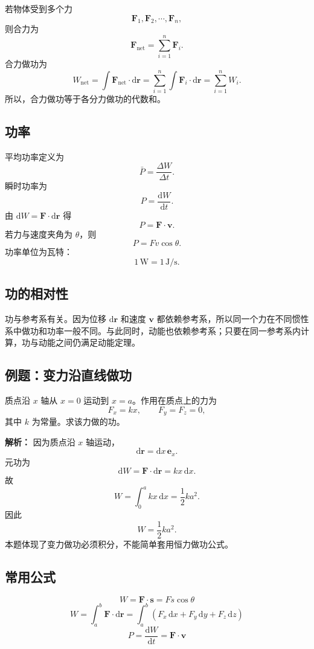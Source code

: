 若物体受到多个力
\[
    \boldsymbol F_1,\boldsymbol F_2,\cdots,\boldsymbol F_n,
\]
则合力为
\[
    \boldsymbol F_{\mathrm{net}}=\sum_{i=1}^{n}\boldsymbol F_i .
\]
合力做功为
\[
    W_{\mathrm{net}}
    =
    \int \boldsymbol F_{\mathrm{net}}\cdot\mathrm d\boldsymbol r
    =
    \sum_{i=1}^{n}
    \int \boldsymbol F_i\cdot\mathrm d\boldsymbol r
    =
    \sum_{i=1}^{n}W_i .
\]
所以，合力做功等于各分力做功的代数和。

\subsection{功率}

平均功率定义为
\[
    \bar P=\frac{\Delta W}{\Delta t}.
\]
瞬时功率为
\[
    P=\frac{\mathrm dW}{\mathrm dt}.
\]
由 $\mathrm dW=\boldsymbol F\cdot\mathrm d\boldsymbol r$ 得
\[
    \boxed{
    P=\boldsymbol F\cdot\boldsymbol v
    } .
\]
若力与速度夹角为 $\theta$，则
\[
    P=Fv\cos\theta .
\]
功率单位为瓦特：
\[
    1\,\mathrm W=1\,\mathrm{J/s}.
\]

\subsection{功的相对性}

功与参考系有关。因为位移 $\mathrm d\boldsymbol r$ 和速度 $\boldsymbol v$ 都依赖参考系，所以同一个力在不同惯性系中做功和功率一般不同。与此同时，动能也依赖参考系；只要在同一参考系内计算，功与动能之间仍满足动能定理。

\subsection{例题：变力沿直线做功}

质点沿 $x$ 轴从 $x=0$ 运动到 $x=a$。作用在质点上的力为
\[
    F_x=kx,\qquad F_y=F_z=0,
\]
其中 $k$ 为常量。求该力做的功。

\textbf{解析：} 因为质点沿 $x$ 轴运动，
\[
    \mathrm d\boldsymbol r=\mathrm dx\,\boldsymbol e_x.
\]
元功为
\[
    \mathrm dW=\boldsymbol F\cdot\mathrm d\boldsymbol r=kx\,\mathrm dx.
\]
故
\[
    W=\int_0^a kx\,\mathrm dx=\frac{1}{2}ka^2.
\]
因此
\[
    \boxed{W=\frac{1}{2}ka^2}.
\]
本题体现了变力做功必须积分，不能简单套用恒力做功公式。

\subsection{常用公式}

\[
    W=\boldsymbol F\cdot\boldsymbol s=Fs\cos\theta
\]
\[
    \boxed{
    W=\int_a^b\boldsymbol F\cdot\mathrm d\boldsymbol r
    =
    \int_a^b
    \left(
    F_x\,\mathrm dx+F_y\,\mathrm dy+F_z\,\mathrm dz
    \right)
    }
\]
\[
    \boxed{
    P=\frac{\mathrm dW}{\mathrm dt}=\boldsymbol F\cdot\boldsymbol v
    }
\]

